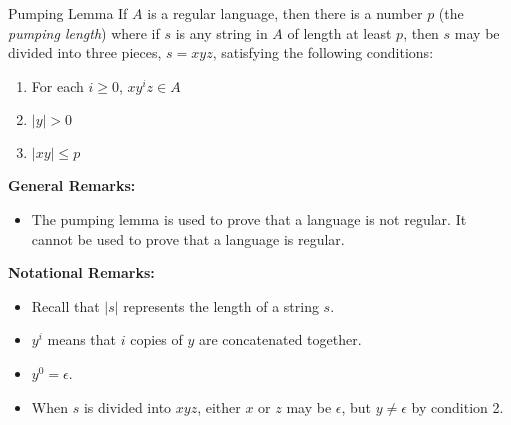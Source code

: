 \documentclass[letterpaper]{article}
\begin{document}
\begin{theorem}{Pumping Lemma}{}
    If $A$ is a regular language, then there is a number $p$ (the \emph{pumping length}) where if $s$ is any string in $A$ of length at least $p$, then $s$ may be divided into three pieces, $s = xyz$, satisfying the following conditions: 
    \begin{enumerate}
        \item For each $i \geq 0$, $xy^i z \in A$
        \item $|y| > 0$
        \item $|xy| \leq p$
    \end{enumerate}
\end{theorem}
\textbf{General Remarks:}
\begin{itemize}
    \item The pumping lemma is used to prove that a language is not regular. It cannot be used to prove that a language is regular. 
\end{itemize}
\textbf{Notational Remarks:}
\begin{itemize}
    \item Recall that $|s|$ represents the length of a string $s$.
    \item $y^i$ means that $i$ copies of $y$ are concatenated together. 
    \item $y^0 = \epsilon$.
    \item When $s$ is divided into $xyz$, either $x$ or $z$ may be $\epsilon$, but $y \neq \epsilon$ by condition 2. 
\end{itemize}
\end{document}
